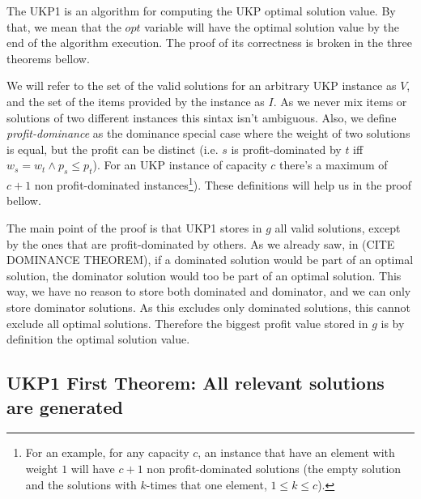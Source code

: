 \documentclass[12pt]{article}
\begin{document}
The UKP1 is an algorithm for computing the UKP optimal solution value. By that, we mean that the \(opt\) variable will have the optimal solution value by the end of the algorithm execution. The proof of its correctness is broken in the three theorems bellow.

We will refer to the set of the valid solutions for an arbitrary UKP instance as \(V\), and the set of the items provided by the instance as \(I\). As we never mix items or solutions of two different instances this sintax isn't ambiguous. Also, we define \textit{profit-dominance} as the dominance special case where the weight of two solutions is equal, but the profit can be distinct (i.e. \(s\) is profit-dominated by \(t\) iff \(w_s = w_t \land p_s \leq p_t\)). For an UKP instance of capacity \(c\) there's a maximum of \(c+1\) non profit-dominated instances\footnote{For an example, for any capacity \(c\), an instance that have an element with weight \(1\) will have \(c+1\) non profit-dominated solutions (the empty solution and the solutions with \(k\)-times that one element, \(1 \leq k \leq c\)).}). These definitions will help us in the proof bellow.

The main point of the proof is that UKP1 stores in \(g\) all valid solutions, except by the ones that are profit-dominated by others. As we already saw, in (CITE DOMINANCE THEOREM), if a dominated solution would be part of an optimal solution, the dominator solution would too be part of an optimal solution. This way, we have no reason to store both dominated and dominator, and we can only store dominator solutions. As this excludes only dominated solutions, this cannot exclude all optimal solutions. Therefore the biggest profit value stored in \(g\) is by definition the optimal solution value.

\subsection{UKP1 First Theorem: All relevant solutions are generated}

\end{document}
